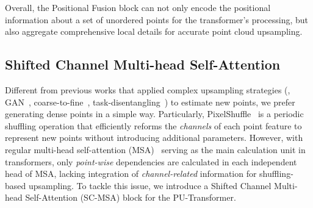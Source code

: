 Overall, the Positional Fusion block can not only encode the positional information about a set of unordered points for the transformer's processing, but also aggregate comprehensive local details for accurate point cloud upsampling.


\subsection{Shifted Channel Multi-head Self-Attention}
\label{sec:body}
Different from previous works that applied complex upsampling strategies (\eg, GAN~\cite{li2019pu}, coarse-to-fine~\cite{liu2020spu}, task-disentangling~\cite{li2021point}) to estimate new points, we prefer generating dense points in a simple way. Particularly, PixelShuffle~\cite{shi2016real} is a periodic shuffling operation that efficiently reforms the \emph{channels} of each point feature to represent new points without introducing additional parameters. However, with regular multi-head self-attention (MSA)~\cite{vaswani2017attention} serving as the main calculation unit in transformers, only \emph{point-wise} dependencies are calculated in each independent head of MSA, lacking integration of \emph{channel-related} information for shuffling-based upsampling. To tackle this issue, we introduce a Shifted Channel Multi-head Self-Attention (SC-MSA) block for the PU-Transformer.

